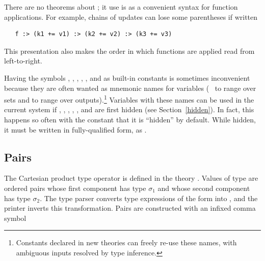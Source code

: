 There are no theorems about \ml{:>}; it use is as a convenient syntax for function applications.
For example, chains of updates can lose some parentheses if written
\begin{hol}
\begin{verbatim}
   f :> (k1 += v1) :> (k2 += v2) :> (k3 += v3)
\end{verbatim}
\end{hol}
This presentation also makes the order in which functions are applied read from left-to-right.

Having the symbols , , , , , and 
as built-in constants
%
%
is sometimes inconvenient because they are often wanted as mnemonic
names for variables (\eg\  to range over sets and  to
range over outputs).\footnote{Constants declared in new theories can
  freely re-use these names, with ambiguous inputs resolved by type
  inference.}  Variables with these names can be used in the current
system if , , , , , and  are first
hidden (see Section~\ref{hidden}).  In fact, this happens so often
with the constant  that it is ``hidden'' by default.  While
hidden, it must be written in fully-qualified form, as
.
%


\subsection{Pairs}\label{prod}

%
The Cartesian  product  type  operator
%
%
%
%
is defined in the theory . Values of type
 are ordered pairs whose first
component has type $\sigma_1$ and whose second component has type
$\sigma_2$.  The \HOL{} type parser
%
%
converts type expressions of the form 
%
%
into ,
%
%
and the printer inverts this transformation. Pairs
%
%
are constructed with an infixed comma symbol

